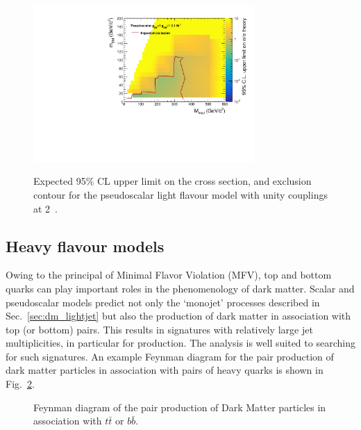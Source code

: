 \begin{figure}
\begin{center}
\includegraphics[width=0.75\textwidth]{figures/DMplots/DMP_finalCanvasExpLimit.pdf} \\
\caption{Expected 95\% CL upper limit on the cross section, and exclusion
contour for the pseudoscalar light flavour model with unity couplings at 2~\ifb.}
\label{fig:dm_P_g1_2fb_2dlimits}
\end{center}
\end{figure}




\clearpage
 \subsection{Heavy flavour models} \label{sec:dm_heavyjet}

Owing to the principal of Minimal Flavor Violation (MFV), top and bottom quarks
can play important roles in the phenomenology of dark matter. Scalar and
pseudoscalar models predict not only the `monojet' processes described in
Sec.~\ref{sec:dm_lightjet} but also the production of dark matter in association
with top (or bottom) pairs. This results in signatures with relatively large jet
multiplicities, in particular for \DMtt production. The \alphat analysis is well 
suited to searching for such signatures. An example Feynman diagram for the pair
production of dark matter particles in association with pairs of heavy quarks is
shown in Fig.~\ref{fig:feynman_hf}.


\begin{figure}[h!] \centering
{}
\caption{Feynman diagram of the pair production of Dark Matter particles in
association with $t\bar{t}$ or $b\bar{b}$. \cite{Abercrombie:2015wmb}}
\label{fig:feynman_hf} \end{figure}


